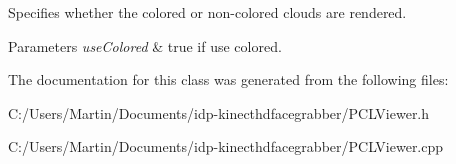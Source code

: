 Specifies whether the colored or non-\/colored clouds are rendered. 


\begin{DoxyParams}{Parameters}
{\em use\+Colored} & true if use colored. \\
\hline
\end{DoxyParams}


The documentation for this class was generated from the following files\+:\begin{DoxyCompactItemize}
\item 
C\+:/\+Users/\+Martin/\+Documents/idp-\/kinecthdfacegrabber/P\+C\+L\+Viewer.\+h\item 
C\+:/\+Users/\+Martin/\+Documents/idp-\/kinecthdfacegrabber/P\+C\+L\+Viewer.\+cpp\end{DoxyCompactItemize}
